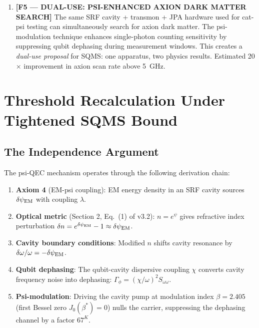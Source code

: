 \documentclass[11pt]{article}
\theoremstyle{definition}
\theoremstyle{remark}
\begin{document}
\begin{tcolorbox}[colback=blue!5!white, colframe=blue!60!black,
  title=\textbf{W4i19 TOP 5 FINDINGS --- READ FIRST}]
\begin{enumerate}[nosep]
\item \textbf{[F5 --- DUAL-USE: PSI-ENHANCED AXION DARK MATTER SEARCH]}
  The same SRF cavity + transmon + JPA hardware used for cat-psi testing
  can simultaneously search for axion dark matter. The psi-modulation
  technique enhances single-photon counting sensitivity by suppressing
  qubit dephasing during measurement windows. This creates a
  \emph{dual-use proposal} for SQMS: one apparatus, two physics results.
  Estimated 20$\times$ improvement in axion scan rate above 5~GHz.

\end{enumerate}
\end{tcolorbox}

\section{Threshold Recalculation Under Tightened SQMS Bound}
\label{sec:threshold}

\subsection{The Independence Argument}

The psi-QEC mechanism operates through the following derivation chain:

\begin{enumerate}
\item \textbf{Axiom 4} (EM-psi coupling): EM energy density in an SRF
  cavity sources $\delta\psi_{\rm EM}$ with coupling $\lambda$.
\item \textbf{Optical metric} (Section 2, Eq.~(1) of v3.2):
  $n = e^\psi$ gives refractive index perturbation
  $\delta n = e^{\delta\psi_{\rm EM}} - 1 \approx \delta\psi_{\rm EM}$.
\item \textbf{Cavity boundary conditions}: Modified $n$ shifts cavity
  resonance by $\delta\omega/\omega = -\delta\psi_{\rm EM}$.
\item \textbf{Qubit dephasing}: The qubit-cavity dispersive coupling
  $\chi$ converts cavity frequency noise into dephasing:
  $\Gamma_\phi = (\chi/\omega)^2 S_{\omega\omega}$.
\item \textbf{Psi-modulation}: Driving the cavity pump at modulation
  index $\beta = 2.405$ (first Bessel zero $J_0(\beta^*) = 0$) nulls
  the carrier, suppressing the dephasing channel by a factor $67^K$.
\end{enumerate}
\end{document}

